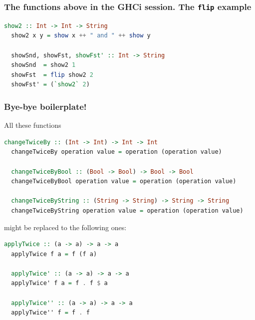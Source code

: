 \documentclass[10pt,pdf,utf8,russian,aspectratio=169]{beamer}
\begin{document}
\begin{frame}[fragile]
  \frametitle{The functions above in the GHCi session. The \verb"flip" example}

  \begin{lstlisting}[language=Haskell]
  show2 :: Int -> Int -> String
  show2 x y = show x ++ " and " ++ show y

  showSnd, showFst, showFst' :: Int -> String
  showSnd  = show2 1
  showFst  = flip show2 2
  showFst' = (`show2` 2)
  \end{lstlisting}

\end{frame}

\begin{frame}[fragile]
  \frametitle{Bye-bye boilerplate!}

  All these functions
  \begin{lstlisting}[language=Haskell]
  changeTwiceBy :: (Int -> Int) -> Int -> Int
  changeTwiceBy operation value = operation (operation value)

  changeTwiceByBool :: (Bool -> Bool) -> Bool -> Bool
  changeTwiceByBool operation value = operation (operation value)

  changeTwiceByString :: (String -> String) -> String -> String
  changeTwiceByString operation value = operation (operation value)
  \end{lstlisting}

  might be replaced to the following ones:
  \begin{lstlisting}[language=Haskell]
  applyTwice :: (a -> a) -> a -> a
  applyTwice f a = f (f a)

  applyTwice' :: (a -> a) -> a -> a
  applyTwice' f a = f . f $ a

  applyTwice'' :: (a -> a) -> a -> a
  applyTwice'' f = f . f
  \end{lstlisting}
\end{frame}
\end{document}
